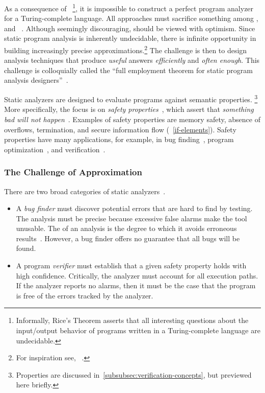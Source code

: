 As a consequence of ~\cite{rice1953}\footnote{Informally,
Rice's Theorem asserts that all interesting questions about the input/output
behavior of programs written in a Turing-complete
language are undecidable.}, it is impossible to construct
a perfect program analyzer for a Turing-complete language. All approaches must
sacrifice something among ,  and
~\cite{moller2024}. Although seemingly discouraging,  should be viewed with optimism. Since static program analysis is
inherently undecidable, there is infinite opportunity in
building increasingly precise approximations.\footnote{For inspiration see,
\eg~\textcite{ding2023}.} The challenge is then to design analysis techniques
that produce \emph{useful} answers \emph{efficiently} and \emph{often enough}.
This challenge is colloquially called the \enquote{full employment theorem for
static program analysis designers}~\cite[p. 4]{moller2023}.

Static analyzers are designed to evaluate programs against semantic properties.%
\footnote{Properties are discussed in~\autoref{subsubsec:verification-concepts},
but previewed here briefly.} More specifically, the focus is on \emph{safety
properties}~\cite[p. 6]{moller2023}, which assert that \emph{something bad will
not happen}~\cite{lamport1977}. Examples of safety properties are memory safety,
absence of overflows, termination, and secure information flow
(\cf~\autoref{if-elements}). Safety properties have many applications, for
example, in bug finding~\cite{popeea2010}, program
optimization~\cite{rinard1996}, and verification~\cite{falcone2009}.

\subsubsection{The Challenge of Approximation}\label{static-approx}

There are two broad categories of static analyzers~\cite{jourdan2015}.

\begin{itemize}

\item A \emph{bug finder} must discover potential errors that are hard to find
by testing. The analysis must be precise because
excessive false alarms make the tool unusable. The \emph{} of an
analysis is the degree to which it avoids erroneous results~\cite{livshits2015}.
However, a bug finder offers no guarantee that all bugs will be found.

\item A program \emph{verifier} must establish that a given safety property
holds with high confidence. Critically, the analyzer must account for all
execution paths. If the analyzer reports no alarms, then it must be the case
that the program is free of the errors tracked by the analyzer.

\end{itemize}

